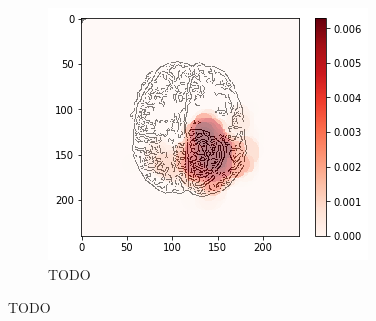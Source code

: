 \begin{figure}[H]
\begin{subfigure}{.33\textwidth}
        \centering
        \includegraphics[width=\linewidth]{chapters/06_hdm/circle20/8.png}
        \caption{TODO}
    \end{subfigure}
    \caption{TODO}
\end{figure}

